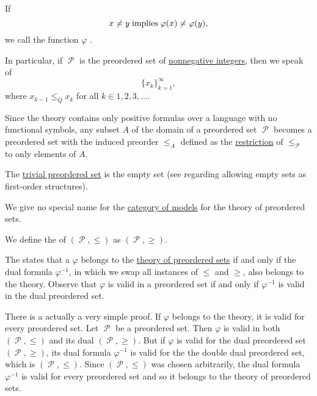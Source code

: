 \begin{definition}
\begin{thmenum}[series=def:preordered_set]
    If
    \begin{equation*}
      x \neq y \T{implies} \varphi(x) \neq \varphi(y),
    \end{equation*}
    we call the function \( \varphi \) .

    In particular, if \( \mscrP \) is the preordered set of \hyperref[rem:peano_arithmetic_zero/nonnegative]{nonnegative integers}, then we speak of 
    \begin{equation*}
      \{ x_k \}_{k=1}^\infty,
    \end{equation*}
    where \( x_{k-1} \leq_Q x_k \) for all \( k \in 1, 2, 3, \ldots \).

     Since the theory contains only positive formulas over a language with no functional symbols, any subset \( A \) of the domain of a preordered set \( \mscrP \) becomes a preordered set with the induced preorder \( \leq_A \) defined as the \hyperref[def:binary_relation/restriction]{restriction} of \( \leq_\mscrP \) to only elements of \( A \).

     The \hyperref[thm:substructures_form_complete_lattice/bottom]{trivial preordered set} is the empty set (see  regarding allowing empty sets as first-order structures).

     We give no special name for the \hyperref[def:category_of_first_order_models]{category of models} for the theory of preordered sets.

     We define the  of \( (\mscrP, \leq) \) as \( (\mscrP, \geq) \).

    The  states that a \( \varphi \) belongs to the \hyperref[def:preordered_set/theory]{theory of preordered sets} if and only if the dual formula \( \varphi^{-1} \), in which we swap all instances of \( \leq \) and \( \geq \), also belongs to the theory. Observe that \( \varphi \) is valid in a preordered set if and only if \( \varphi^{-1} \) is valid in the dual preordered set.

    There is a actually a very simple proof. If \( \varphi \) belongs to the theory, it is valid for every preordered set. Let \( \mscrP \) be a preordered set. Then \( \varphi \) is valid in both \( (\mscrP, \leq) \) and its dual \( (\mscrP, \geq) \). But if \( \varphi \) is valid for the dual preordered set \( (\mscrP, \geq) \), its dual formula \( \varphi^{-1} \) is valid for the the double dual preordered set, which is \( (\mscrP, \leq) \). Since \( (\mscrP, \leq) \) was chosen arbitrarily, the dual formula \( \varphi^{-1} \) is valid for every preordered set and so it belongs to the theory of preordered sets.


\end{thmenum}
\end{definition}
